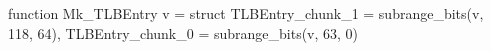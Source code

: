 function Mk_TLBEntry v = struct { TLBEntry_chunk_1 = subrange_bits(v, 118, 64), TLBEntry_chunk_0 = subrange_bits(v, 63, 0) }
